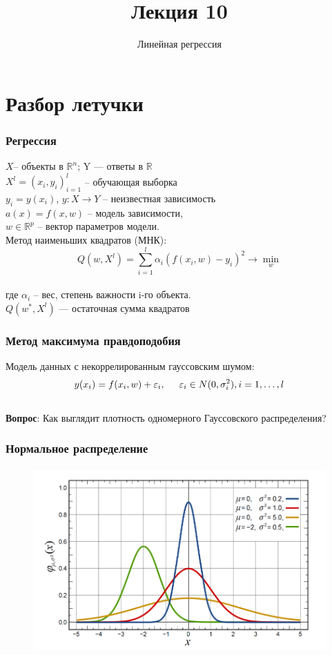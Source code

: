 \documentclass[10pt]{beamer}
\title{Лекция 10}
\subtitle{Линейная регрессия}
\begin{document}
	

\section{Разбор летучки}

\frame{\titlepage}

\begin{frame}\frametitle{Регрессия}
	$X$-- объекты в $\mathbb{R}^n$; Y — ответы в $\mathbb{R}$\\
	$X^l = (x_i, y_i)_{i=1}^l$ -- обучающая выборка\\
	$y_i = y(x_i)$,  $y : X \rightarrow Y$ -- неизвестная зависимость\\
	\bigbreak
	$a(x) = f (x, w)$ -- модель зависимости,\\
	$w \in \mathbb{R}^p$ -- вектор параметров модели.\\
	\bigbreak
	Метод наименьших квадратов (МНК):\\
	$$Q(w,X^l) = \sum\limits_{i=1}^l \alpha_i (f (x_i, w) - y_i)^2 \rightarrow \min\limits_{w}$$\\
	где $\alpha_i$ -- вес, степень важности i-го объекта.\\
	$Q(w^*,X^l)$ — остаточная сумма квадратов
\end{frame}

\begin{frame}\frametitle{Метод максимума правдоподобия}
	Модель данных с некоррелированным гауссовским шумом:\\
	$$y(x_i) = f (x_i, w) + \varepsilon_i, \hspace{5mm} \varepsilon_i \in N (0, \sigma_i^2), i = 1, \dots, l$$\\
	\bigbreak
	\textbf{Вопрос}: Как выглядит плотность одномерного Гауссовского распределения?
\end{frame}

\begin{frame}\frametitle{Нормальное распределение}
	\begin{figure}[htbp]
	  \includegraphics[height=200pt, keepaspectratio = true]{images/gauss}   
	\end{figure}
\end{frame}
\end{document}
